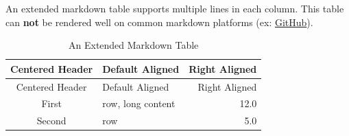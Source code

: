 \documentclass[10pt, a4paper, oneside]{article}
\begin{document}
An extended markdown table supports multiple lines in each column.
This table can \textbf{not} be rendered well on common markdown platforms (ex: \href{https://github.com/}{GitHub}).

\begin{longtable}[c]{@{}clr@{}}
\caption{An Extended Markdown Table \label{em-table}}\tabularnewline
\toprule
\begin{minipage}[b]{0.14\columnwidth}\centering\strut
Centered
Header
\strut\end{minipage} & \begin{minipage}[b]{0.11\columnwidth}\raggedright\strut
Default
Aligned
\strut\end{minipage} & \begin{minipage}[b]{0.11\columnwidth}\raggedleft\strut
Right
Aligned
\strut\end{minipage}\tabularnewline
\midrule
\endfirsthead
\toprule
\begin{minipage}[b]{0.14\columnwidth}\centering\strut
Centered
Header
\strut\end{minipage} & \begin{minipage}[b]{0.11\columnwidth}\raggedright\strut
Default
Aligned
\strut\end{minipage} & \begin{minipage}[b]{0.11\columnwidth}\raggedleft\strut
Right
Aligned
\strut\end{minipage}\tabularnewline
\midrule
\endhead
\begin{minipage}[t]{0.14\columnwidth}\centering\strut
First
\strut\end{minipage} & \begin{minipage}[t]{0.11\columnwidth}\raggedright\strut
row,
long
content
\strut\end{minipage} & \begin{minipage}[t]{0.11\columnwidth}\raggedleft\strut
12.0
\strut\end{minipage}\tabularnewline
\begin{minipage}[t]{0.14\columnwidth}\centering\strut
Second
\strut\end{minipage} & \begin{minipage}[t]{0.11\columnwidth}\raggedright\strut
row
\strut\end{minipage} & \begin{minipage}[t]{0.11\columnwidth}\raggedleft\strut
5.0
\strut\end{minipage}\tabularnewline
\bottomrule
\end{longtable}
\end{document}
